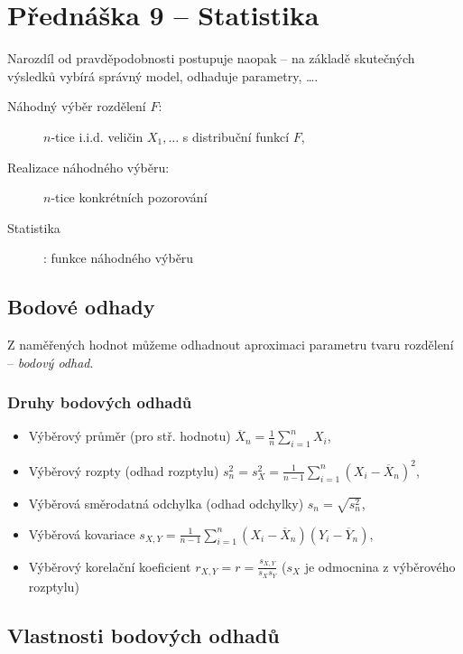 \section{Přednáška 9 -- Statistika}

Narozdíl od pravděpodobnosti postupuje naopak -- na základě skutečných výsledků vybírá správný model, odhaduje parametry, \dots.

\begin{description}
    \item[Náhodný výběr rozdělení $F$:] $n$-tice i.i.d. veličin $X_1, \dots$ s distribuční funkcí $F$,
    \item[Realizace náhodného výběru:] $n$-tice konkrétních pozorování
    \item[Statistika]: funkce náhodného výběru
\end{description}

\subsection{Bodové odhady}

Z naměřených hodnot můžeme odhadnout aproximaci parametru tvaru rozdělení -- \textit{bodový odhad}.

\subsubsection*{Druhy bodových odhadů}

\begin{itemize}
    \item Výběrový průměr (pro stř. hodnotu) $\overline{X}_n = \frac{1}{n}\sum_{i=1}^{n}{X_i}$,
    \item Výběrový rozpty (odhad rozptylu) $s_{n}^2 = s_{X}^2 = \frac{1}{n-1}{\sum_{i=1}^{n}{(X_i - \overline{X}_n)^2}}$,
    \item Výběrová směrodatná odchylka (odhad odchylky) $s_n = \sqrt{s_{n}^2}$,
    \item Výběrová kovariace $s_{X,Y} = \frac{1}{n-1}\sum_{i=1}^{n}{(X_i - \overline{X}_n)(Y_i - \overline{Y}_n)}$,
    \item Výběrový korelační koeficient $r_{X,Y} = r = \frac{s_{X,Y}}{s_X s_Y}$ ($s_X$ je odmocnina z výběrového rozptylu)
\end{itemize}

\subsection{Vlastnosti bodových odhadů}

